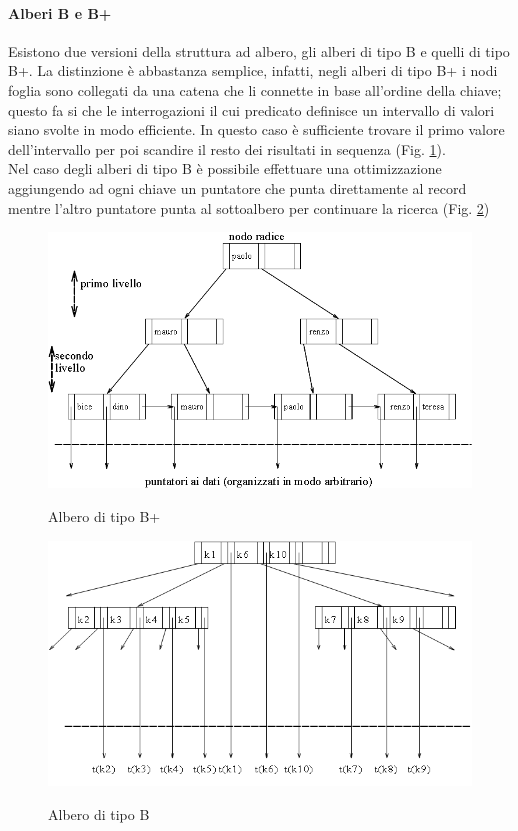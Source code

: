 \paragraph{Alberi B e B+}
Esistono due versioni della struttura ad albero, gli alberi di tipo B e quelli di tipo B+. La distinzione è abbastanza semplice, infatti, negli alberi di tipo B+ i nodi foglia sono collegati da una catena che li connette in base all'ordine della chiave; questo fa si che le interrogazioni il cui predicato definisce un intervallo di valori siano svolte in modo efficiente. In questo caso è sufficiente trovare il primo valore dell'intervallo per poi scandire il resto dei risultati in sequenza (Fig. \ref{fig:B+tree}).\\
Nel caso degli alberi di tipo B è possibile effettuare una ottimizzazione aggiungendo ad ogni chiave un puntatore che punta direttamente al record mentre l'altro puntatore punta al sottoalbero per continuare la ricerca (Fig. \ref{fig:Btree})
\begin{figure}
  \centering
  \includegraphics[width=12cm]{img/bptree.png}\\
  \caption{Albero di tipo B+}\label{fig:B+tree}
\end{figure}
\begin{figure}
  \centering
  \includegraphics[width=12cm]{img/btree.png}\\
  \caption{Albero di tipo B}\label{fig:Btree}
\end{figure}
